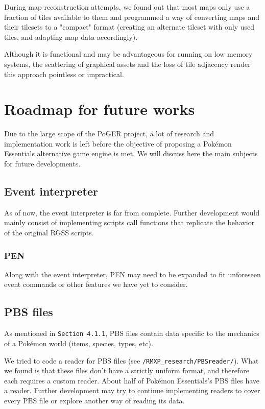 \documentclass[11pt]{article}
\begin{document}
{During map reconstruction attempts, we found out that most maps only use a fraction of tiles available to them and programmed a way of converting maps and their tilesets to a "compact" format (creating an alternate tileset with only used tiles, and adapting map data accordingly).

Although it is functional and may be advantageous for running on low memory systems, the scattering of graphical assets and the loss of tile adjacency render this approach pointless or impractical. 


\newpage 
\section{Roadmap for future works}

Due to the large scope of the PoGER project, a lot of research and implementation work is left before the objective of proposing a Pokémon Essentials alternative game engine is met. We will discuss here the main subjects for future developments.


\subsection{Event interpreter}

As of now, the event interpreter is far from complete. Further development would mainly consist of implementing scripts call functions that replicate the behavior of the original RGSS scripts.

\subsubsection{PEN}

Along with the event interpreter, PEN may need to be expanded to fit unforeseen event commands or other features we have yet to consider.

\subsection{PBS files}

As mentioned in \texttt{Section 4.1.1}, PBS files contain data specific to the mechanics of a Pokémon world (items, species, types, etc).

We tried to code a reader for PBS files (see \texttt{/RMXP\_research/PBSreader/}). What we found is that these files don't have a strictly uniform format, and therefore each requires a custom reader. About half of Pokémon Essentials's PBS files have a reader. Further development may try to continue implementing readers to cover every PBS file or explore another way of reading its data.

}
\end{document}
